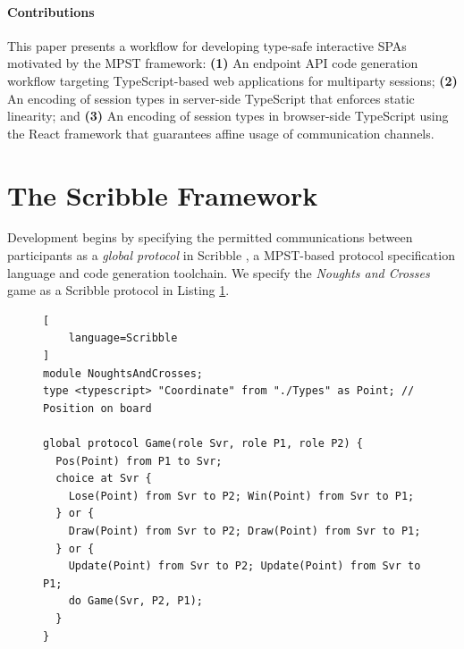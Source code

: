 \documentclass[submission,copyright,creativecommons]{eptcs}
\newcommand{\sectionref}[1]{\textsection~\ref{#1}}
\begin{document}
\paragraph{Contributions}
This paper presents a workflow for developing type-safe interactive SPAs motivated by the MPST framework: \textbf{(1)} An endpoint API code generation workflow targeting TypeScript-based web applications for multiparty sessions; \textbf{(2)} An encoding of session types in server-side TypeScript that enforces static linearity; and \textbf{(3)} An encoding of session types in browser-side TypeScript using the React framework that guarantees affine usage of communication channels.


\section{The Scribble Framework}
\label{section:scribble}

Development begins by specifying the permitted communications between participants as a \textit{global protocol} in Scribble \cite{Scribble}, a MPST-based protocol specification language and code generation toolchain. We specify the \textit{Noughts and Crosses} game as a Scribble protocol in Listing \ref{lst:game}.

\begin{figure}[!h]
\begin{lstlisting}[
	language=Scribble
]
module NoughtsAndCrosses;
type <typescript> "Coordinate" from "./Types" as Point;	// Position on board

global protocol Game(role Svr, role P1, role P2) {
  Pos(Point) from P1 to Svr;
  choice at Svr {
    Lose(Point) from Svr to P2; Win(Point) from Svr to P1;
  } or {
    Draw(Point) from Svr to P2; Draw(Point) from Svr to P1;
  } or {
    Update(Point) from Svr to P2; Update(Point) from Svr to P1;
    do Game(Svr, P2, P1);
  }
}
\end{lstlisting}
\label{lst:game}
\end{figure}
\end{document}
